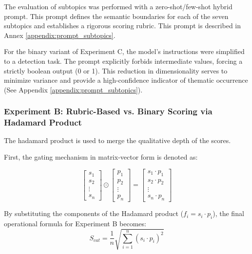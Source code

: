 The evaluation of subtopics was performed with a zero-shot/few-shot hybrid prompt. This prompt defines the semantic boundaries for each of the seven subtopics and establishes a rigorous scoring rubric. This prompt is described in Annex \ref{appendix:prompt_subtopics}.

For the binary variant of Experiment C, the model's instructions were simplified to a detection task. The prompt explicitly forbids intermediate values, forcing a strictly boolean output (0 or 1). This reduction in dimensionality serves to minimize variance and provide a high-confidence indicator of thematic occurrence (See Appendix \ref{appendix:prompt_subtopics}).

        
        \subsubsection{Experiment B: Rubric-Based vs. Binary Scoring via Hadamard Product}

The hadamard product is used to merge the qualitative depth of the scores.

First, the gating mechanism in matrix-vector form is denoted as:

\begin{equation}
    \begin{bmatrix} s_1 \\ s_2 \\ \vdots \\ s_n \end{bmatrix} \odot \begin{bmatrix} p_1 \\ p_2 \\ \vdots \\ p_n \end{bmatrix} = \begin{bmatrix} s_1 \cdot p_1 \\ s_2 \cdot p_2 \\ \vdots \\ s_n \cdot p_n \end{bmatrix}
\end{equation}

By substituting the components of the Hadamard product ($f_i = s_i \cdot p_i$), the final operational formula for Experiment B becomes:\begin{equation}S_{cat} = \frac{1}{n}\sqrt{\sum_{i=1}^{n} (s_i \cdot p_i)^2}\end{equation}




